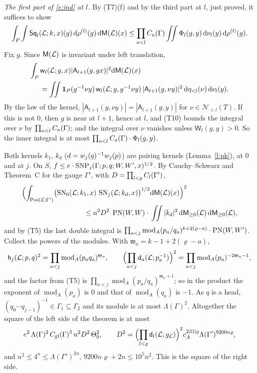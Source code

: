 \documentclass[11pt,a4paper]{article}
\makeatletter
\theoremstyle{plainx}
\theoremstyle{uprightx}
\renewenvironment{proof}[1][Proof]{\par\pushQED{\qed}\normalfont\topsep0pt\partopsep0pt
  \trivlist\item[\hskip\labelsep\itshape #1.]\ignorespaces}{\popQED\endtrivlist\@endpefalse}
\newcommand{\cL}{\mathcal{L}}
\newcommand{\dd}{\mathrm{d}}
\newcommand{\Nb}[2]{\mathcal{N}_{<#1}(#2)}
\newcommand{\modA}{\operatorname{mod}_A}
\newcommand{\gL}[1]{g_{#1}}
\newcommand{\etab}[1]{\eta_{<#1}}
\newcommand{\Inp}[1]{\textup{(#1)}}
\makeatother
\begin{document}
\begin{proof}[Proof of Theorem C]
\emph{The first part of \eqref{e:ind} at $l$.} By \Inp{T7}(f) and by the third part at $l$, just proved, it
suffices to show
\[\int_P\int\weightedSquare{\cL}{l}{k}{x}{g}\,\dd\rho^{(l)}(g)\,\dd\groupMeasure{\cL}(x)\le
\prod_{a<l}\floorConst{\Gamma}{a}\iint\Phi_l(g,y)\,\dd\nu_l(y)\,\dd\rho^{(l)}(g).\]
Fix $g$. Since
$\groupMeasure{\cL}$ is invariant under left translation,
\[\begin{aligned}\int_P{}&\floorWeight{\cL}{l}{g}{x}|\mathsf{A}_{l+1}(g,gx)|^2\dd\groupMeasure{\cL}(x)\\
&=\iint\mathbf{1}_P(g^{-1}\nu y)\,\floorWeight{\cL}{l}{g}{g^{-1}\nu y}\,|\mathsf{A}_{l+1}(g,\nu y)|^2\,\dd\etab{l}(\nu)\,\dd\nu_l(y).\end{aligned}\]
By the law of the kernel, $|\mathsf{A}_{l+1}(g,\nu y)|=|\mathsf{A}_{l+1}(g,y)|$ for $\nu\in\Nb{l}{T}$. If this is not
$0$, then $g$ is near at $l+1$, hence at $l$, and \Inp{T10} bounds the integral over $\nu$ by
$\prod_{a<l}\floorConst{\Gamma}{a}$; and the integral over $\nu$ vanishes unless $\mathsf{W}_l(g,y)>0$. So the inner
integral is at most $\prod_{a<l}\floorConst{\Gamma}{a}\cdot\Phi_l(g,y)$.
\end{proof}

\begin{proof}[Proof of Theorem D]
Both kernels $k_1$, $k_d$ ($d=\weylRatio{j}{p}{q}$) are pairing kernels (Lemma~\ref{l:pk}), at $0$ and at $j$. On $S$,
$f\le e\cdot\selfNormProduct{j}{p}{q}{W}{W'}{x}{\Gamma}^{1/2}$. By Cauchy--Schwarz and Theorem~C for the gauge
$\Gamma'$, with $D=\prod_{l<\varrho}\floorConst{\Gamma'}{l}$,
\[\begin{aligned}\Bigl(\int_{\positionsOfSize{\cL}{\Gamma'}}\bigl(\selfNorm{\cL}{0}{k_1}{x}\,\selfNorm{\cL}{j}{k_d}{x}\bigr)^{1/2}&\dd\groupMeasure{\cL}(x)\Bigr)^{2}\\
\le n^2D^{2}\;\pairingNorm{W}{W}\cdot{}&\iint|k_d|^2\,\dd\upperMeasure{\cL}{0}\,\dd\upperMeasure{\cL}{0},\end{aligned}\]
and by \Inp{T5} the last double integral is $\prod_{a<j}\modA(p_a/q_a)^{k+2(\varrho-a)}\cdot\pairingNorm{W}{W'}$.
Collect the powers of the modules. With $\mathfrak{w}_a=k-1+2(\varrho-a)$,
\[\headDensity{j}{p}{q}{\cL}^{2}=\prod_{a<j}\modA(p_aq_a)^{\mathfrak{w}_a},\qquad
\Bigl(\prod_{a<j}\floorModulus{\cL}{a}{p_a^{-1}}\Bigr)^{2}=\prod_{a<j}\modA(p_a)^{-2\mathfrak{w}_a-1},\]
and the factor from \Inp{T5} is $\prod_{a<j}\modA(p_a/q_a)^{\mathfrak{w}_a+1}$; so in the product the exponent of $\modA(p_a)$
is $0$ and that of $\modA(q_a)$ is $-1$. As $q$ is a head, $(q_0\cdots q_{j-1})^{-1}\in\Gamma_1\subseteq\Gamma_2$ and its
module is at most $\Lambda(\Gamma)^2$. Altogether the square of the left side of the theorem is at most
\[e^2\,\Lambda(\Gamma)^{2}\,\globalConst{\Gamma}^{3}\,n^2D^2\,\Theta_0^2,\qquad
D^2=\Bigl(\prod_{l<\varrho}\floorModulus{\cL}{l}{\gL{\cL}}\Bigr)^{2}c_A^{2|\Omega|\varrho}\Lambda(\Gamma')^{9200n\varrho},\]
and $n^2\le4^{n}\le\Lambda(\Gamma')^{2n}$, $9200n\varrho+2n\le10^5n^2$. This is the square of the right side.
\end{proof}
\end{document}
